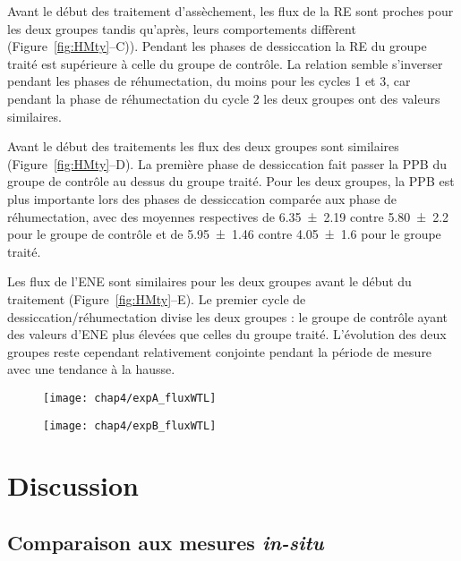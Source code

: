 Avant le début des traitement d'assèchement, les flux de la RE sont proches pour les deux groupes tandis qu'après, leurs comportements diffèrent (Figure~\ref{fig:HMty}--C)).
Pendant les phases de dessiccation la RE du groupe traité est supérieure à celle du groupe de contrôle.
La relation semble s'inverser pendant les phases de réhumectation, du moins pour les cycles 1 et 3, car pendant la phase de réhumectation du cycle 2 les deux groupes ont des valeurs similaires.

Avant le début des traitements les flux des deux groupes sont similaires (Figure~\ref{fig:HMty}--D).
La première phase de dessiccation fait passer la PPB du groupe de contrôle au dessus du groupe traité.
Pour les deux groupes, la PPB est plus importante lors des phases de dessiccation comparée aux phase de réhumectation, avec des moyennes respectives de \num{6.35(219)} contre \num{5.80(220)} pour le groupe de contrôle et de \num{5.95(146)} contre \SI{4.05(160)}{\uml} pour le groupe traité.

Les flux de l'ENE sont similaires pour les deux groupes avant le début du traitement (Figure~\ref{fig:HMty}--E).
Le premier cycle de dessiccation/réhumectation divise les deux groupes : le groupe de contrôle ayant des valeurs d'ENE plus élevées que celles du groupe traité.
L'évolution des deux groupes reste cependant relativement conjointe pendant la période de mesure avec une tendance à la hausse.

\begin{figure}
\centering
\begin{minipage}{.5\textwidth}
  \centering
  \texttt{[image: chap4/expA\_fluxWTL]}
  \label{fig:test1}
\end{minipage}%
\begin{minipage}{.5\textwidth}
  \centering
  \texttt{[image: chap4/expB\_fluxWTL]}
  \label{fig:test2}
\end{minipage}
\end{figure}


\section{Discussion}

\subsection{Comparaison aux mesures \textit{in-situ}}

